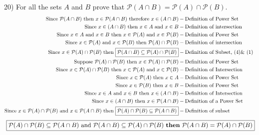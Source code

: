 \documentclass[11pt]{article}
\newcommand*{\mybox}[1]{\framebox{#1}}
\begin{document}
\begin{flushleft}
20) For all the sets $A$ and $B$ prove that $\mathcal{P}(A\cap B) = \mathcal{P}(A) \cap \mathcal{P}(B).$
\vspace{-3mm}
\begin{align}
\text{Since } \mathcal{P}(A\cap B) \text{ then } x\in \mathcal{P}(A\cap B) \text{ therefore } x\in (A\cap B) &- \text{Definition of Power Set}\\
\text{Since } x\in (A\cap B) \text{ then } x\in A  \text{ and } x\in B &- \text{Definition of intersection}\\
\text{Since }x\in A  \text{ and } x\in B   \text{ then }x\in \mathcal{P}(A)  \text{ and } x\in  \mathcal{P}(B) &- \text{Definition of Power Set }\\
\text{Since }x\in \mathcal{P}(A)  \text{ and } x\in \mathcal{P}(B) \text{ then }\mathcal{P}(A) \cap \mathcal{P}(B) &- \text{Definition of intersection}\\
\text{Since } x\in \mathcal{P}(A) \cap \mathcal{P}(B) \text{ then \mybox{$\mathcal{P}(A\cap B) \subseteq \mathcal{P}(A) \cap \mathcal{P}(B)$}}  &- \text{Definition of Subset, (4)\& (1) }\\
\text{Suppose }  \mathcal{P}(A) \cap \mathcal{P}(B) \text{ then } x\in \mathcal{P}(A) \cap \mathcal{P}(B)  &- \text{Definition of Power Set}\\
\text{Since } x\in \mathcal{P}(A) \cap \mathcal{P}(B) \text{ then } x\in \mathcal{P}(A)  \text{ and } x\in \mathcal{P}(B)  &- \text{Definition of Intersection}\\
\text{Since }x\in \mathcal{P}(A) \text{ then }  x\in A  &- \text{Definition of Power Set}\\
\text{Since }x\in \mathcal{P}(B) \text{ then }  x\in B  &- \text{Definition of Power Set}\\
\text{Since } x\in A \text{ and } x\in B \text{ then }  x\in (A\cap B)  &- \text{Definition of Intersection }\\
\text{Since }  x\in (A\cap B) \text{ then } x\in \mathcal{P}(A\cap B) &- \text{Definition of a Power Set}\\
\text{Since } x\in \mathcal{P}(A) \cap \mathcal{P}(B)  \text{ and }  x\in \mathcal{P}(A\cap B)    \text{ then }  \mybox{$\mathcal{P}(A) \cap \mathcal{P}(B) \subseteq \mathcal{P}(A\cap B)$}  &- \text{Definition of subset }
\end{align}
\vspace{-5mm}
$$\text{ \mybox{$ \mathcal{P}(A) \cap \mathcal{P}(B) \subseteq \mathcal{P}(A\cap B) \text{ and }  \mathcal{P}(A\cap B) \subseteq \mathcal{P}(A) \cap \mathcal{P}(B)    \text{ \textbf{then} } \mathcal{P}(A\cap B) = \mathcal{P}(A) \cap \mathcal{P}(B)$}}$$


\end{flushleft}
\end{document}
